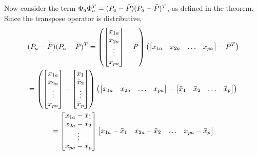 \documentclass[12pt]{report}
\begin{document}
\begin{myproof}
                Now consider the term $\Phi_a \Phi_a^T = (P_a - \bar{P})(P_a - \bar{P})^T$, as defined in the theorem. Since the transpose operator is distributive,
                \begin{gather*}
                    (P_a - \bar{P})(P_a - \bar{P})^{T} =
                        \left(
                            \begin{bmatrix}
                                x_{1a} \\
                                x_{2a} \\
                                \vdots \\
                                x_{pa}
                            \end{bmatrix} - \bar{P}
                        \right)
                        \left(
                            \begin{bmatrix}
                                x_{1a} & x_{2a} & \dotsc & x_{pa}
                            \end{bmatrix} - \bar{P}^T
                        \right)
                    \\
                    = \left(
                        \begin{bmatrix}
                            x_{1a} \\
                            x_{2a} \\
                            \vdots \\
                            x_{pa}
                        \end{bmatrix} - \begin{bmatrix}
                            \bar{x}_1 \\
                            \bar{x}_2 \\
                            \vdots \\
                            \bar{x}_p
                        \end{bmatrix}
                    \right)
                    \left(
                        \begin{bmatrix}
                            x_{1a} & x_{2a} & \dotsc & x_{pa}
                        \end{bmatrix} - \begin{bmatrix}
                            \bar{x}_1 & \bar{x}_2 & \dotsc & \bar{x}_p
                        \end{bmatrix}
                    \right)
                    \\
                    = \begin{bmatrix}
                        x_{1a} - \bar{x}_1 \\
                        x_{2a} - \bar{x}_2 \\
                        \vdots \\
                        x_{pa} - \bar{x}_p
                    \end{bmatrix} \begin{bmatrix}
                        x_{1a} - \bar{x}_1 & x_{2a} - \bar{x}_2 & \dotsc & x_{pa} - \bar{x}_p
                    \end{bmatrix}
                \end{gather*}
            


\end{myproof}
\end{document}

